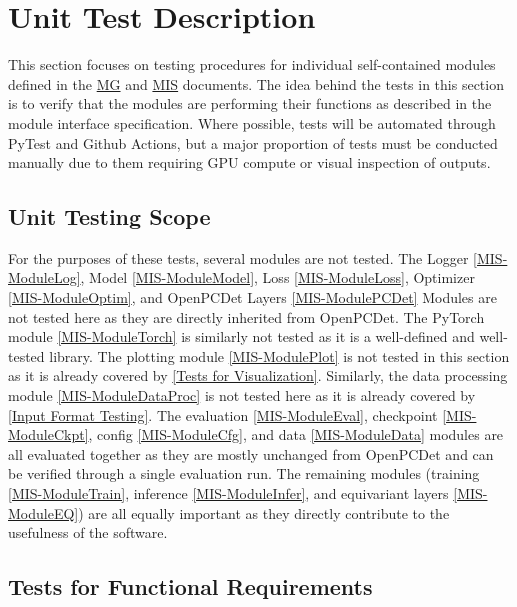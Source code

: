 \documentclass[12pt, titlepage]{article}
\begin{document}
\newpage

\section{Unit Test Description}

This section focuses on testing procedures for individual self-contained modules defined in the 
\href{https://github.com/alaapgrandhi/equivariant-sensor-fusion/blob/main/docs/Design/SoftArchitecture/MG.pdf}{MG} and 
\href{https://github.com/alaapgrandhi/equivariant-sensor-fusion/blob/main/docs/Design/SoftDetailedDes/MIS.pdf}{MIS} documents. 
The idea behind the tests in this section is to verify that the modules are performing their functions as described in the module interface 
specification. Where possible, tests will be automated through PyTest and Github Actions, but a major proportion of tests must be conducted 
manually due to them requiring GPU compute or visual inspection of outputs.

\subsection{Unit Testing Scope}

For the purposes of these tests, several modules are not tested. The Logger \ref{MIS-ModuleLog}, Model \ref{MIS-ModuleModel}, Loss \ref{MIS-ModuleLoss}, Optimizer \ref{MIS-ModuleOptim}, and OpenPCDet Layers \ref{MIS-ModulePCDet} Modules are not tested here as they are directly inherited from OpenPCDet.
The PyTorch module \ref{MIS-ModuleTorch} is similarly not tested as it is a well-defined and well-tested library. The plotting module \ref{MIS-ModulePlot} is not tested in this section as it is already covered by \ref{Tests for Visualization}. Similarly, the data processing module \ref{MIS-ModuleDataProc} is not tested here as it is already covered by \ref{Input Format Testing}. 
The evaluation \ref{MIS-ModuleEval}, checkpoint \ref{MIS-ModuleCkpt}, config \ref{MIS-ModuleCfg}, and data \ref{MIS-ModuleData} modules are all evaluated together as they are mostly unchanged from OpenPCDet and can be verified through a single evaluation run. The remaining modules (training \ref{MIS-ModuleTrain}, inference \ref{MIS-ModuleInfer}, and equivariant layers \ref{MIS-ModuleEQ}) are all equally important as they directly contribute to the usefulness of the software.

\subsection{Tests for Functional Requirements}
\end{document}
